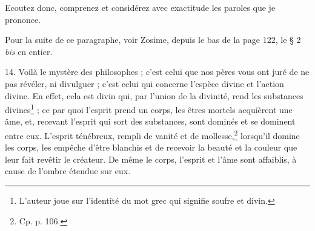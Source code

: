 \documentclass[a4paper, 11pt, oneside, polutonikogreek, french]{article}
\begin{document}
Ecoutez donc, comprenez et considérez avec exactitude les paroles que je prononce.

Pour la suite de ce paragraphe, voir Zosime, depuis le bas de la page 122, le § 2 \emph{bis} en entier.

14. Voilà le mystère des philosophes ; c'est celui que nos pères vous ont juré de ne pas révéler, ni divulguer ; c'est celui qui concerne l'espèce divine et l'action divine. En effet, cela est divin qui, par l'union de la divinité, rend les substances divines\footnote{L'auteur joue sur l'identité du mot grec qui signifie soufre et divin.} ; ce par quoi l'esprit prend un corps, les êtres mortels acquièrent une âme, et, recevant l'esprit qui sort des substances, sont dominés et se dominent entre eux. L'esprit ténébreux, rempli de vanité et de mollesse,\footnote{Cp. p. 106.} lorsqu'il domine les corps, les empêche d'être blanchis et de recevoir la beauté et la couleur que leur fait revêtir le créateur. De même le corps, l'esprit et l'âme sont affaiblis, à cause de l'ombre étendue sur eux.
\end{document}
